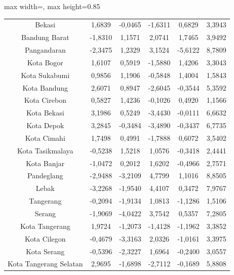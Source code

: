 \begin{table}[H]
\begin{adjustbox}{max width=\textwidth, max height=0.85\textheight}
\begin{tabular}{|c|c|c|c|c|c|}
Bekasi & 1,6839 & -0,0465 & -1,6311 & 0,6829 & 3,3943 \\
Bandung Barat & -1,8310 & 1,1571 & 2,0741 & 1,7465 & 3,9492 \\
Pangandaran & -2,3475 & 1,2329 & 3,1524 & -5,6122 & 8,7809 \\
Kota Bogor & 1,6107 & 0,5919 & -1,5880 & 1,4206 & 3,3043 \\
Kota Sukabumi & 0,9856 & 1,1906 & -0,5848 & 1,4004 & 1,5843 \\
Kota Bandung & 2,6071 & 0,8947 & -2,6045 & -0,3544 & 5,3592 \\
Kota Cirebon & 0,5827 & 1,4236 & -0,1026 & 0,4920 & 1,1566 \\
Kota Bekasi & 3,1986 & 0,5249 & -3,4430 & -0,0111 & 6,6632 \\
Kota Depok & 3,2845 & -0,3484 & -3,4890 & -0,3437 & 6,7735 \\
Kota Cimahi & 1,7498 & 0,4991 & -1,7888 & 0,6072 & 3,5402 \\
Kota Tasikmalaya & -0,5238 & 1,5218 & 1,0576 & -0,3418 & 2,4441 \\
Kota Banjar & -1,0472 & 0,2012 & 1,6202 & -0,4966 & 2,7571 \\
Pandeglang & -2,9488 & -3,2109 & 4,7799 & 1,1016 & 8,8505 \\
Lebak & -3,2268 & -1,9540 & 4,4107 & 0,3472 & 7,9767 \\
Tangerang & -0,2094 & -1,9134 & 1,0813 & -1,1286 & 1,5106 \\
Serang & -1,9069 & -4,0422 & 3,7542 & 0,5357 & 7,2805 \\
Kota Tangerang & 1,9724 & -1,2073 & -1,4128 & -1,1962 & 3,3852 \\
Kota Cilegon & -0,4679 & -3,3163 & 2,0326 & -1,0161 & 3,3975 \\
Kota Serang & -0,5396 & -2,3227 & 1,6964 & -0,2400 & 3,0557 \\
Kota Tangerang Selatan & 2,9695 & -1,6898 & -2,7112 & -0,1689 & 5,8808 \\
\hline
\end{tabular}
\end{adjustbox}
\end{table}